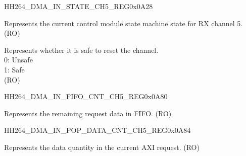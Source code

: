     
    \begin{register}{H}{H264\_DMA\_IN\_STATE\_CH5\_REG}{0x0A28}\label{regdesc:H264DMAINSTATECH5REG}
    \regnewline%
    \begin{regdesc}\begin{reglist}
    \label{fielddesc:H264DMAINSTATECH5}\item [H264\_DMA\_IN\_STATE\_CH5] Represents the current control module state machine state for RX channel 5. (RO)
    \label{fielddesc:H264DMAINRESETAVAILCH5}\item [H264\_DMA\_IN\_RESET\_AVAIL\_CH5] Represents whether it is safe to reset the channel.
    \\0: Unsafe
    \\1: Safe\\ (RO)
    \end{reglist}\end{regdesc}
    \end{register}
    
    \begin{register}{H}{H264\_DMA\_IN\_FIFO\_CNT\_CH5\_REG}{0x0A80}\label{regdesc:H264DMAINFIFOCNTCH5REG}
    \regnewline%
    \begin{regdesc}\begin{reglist}
    \label{fielddesc:H264DMAINCMDFIFOINFIFOCNTCH5}\item [H264\_DMA\_IN\_CMDFIFO\_INFIFO\_CNT\_CH5] Represents the remaining request data in FIFO. (RO)
    \end{reglist}\end{regdesc}
    \end{register}
    
    
    \begin{register}{H}{H264\_DMA\_IN\_POP\_DATA\_CNT\_CH5\_REG}{0x0A84}\label{regdesc:H264DMAINPOPDATACNTCH5REG}
    \regnewline%
    \begin{regdesc}\begin{reglist}
    \label{fielddesc:H264DMAINCMDFIFOPOPDATACNTCH5}\item [H264\_DMA\_IN\_CMDFIFO\_POP\_DATA\_CNT\_CH5] Represents the data quantity in the current AXI request. (RO)
    \end{reglist}\end{regdesc}
    \end{register}
    
